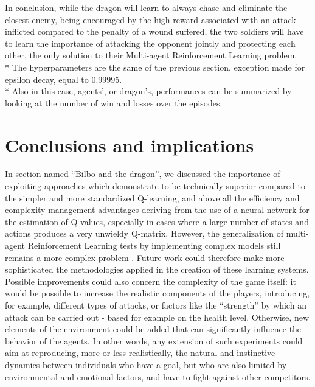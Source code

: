 In conclusion, while the dragon will learn to always chase and eliminate the closest enemy, being encouraged by the high reward associated with an attack inflicted compared to the penalty of a wound suffered, the two soldiers will have to learn the importance of attacking the opponent jointly and protecting each other, the only solution to their Multi-agent Reinforcement Learning problem.\\*
The hyperparameters are the same of the previous section, exception made for epsilon decay, equal to 0.99995.\\*
Also in this case, agents', or dragon's, performances can be summarized by looking at the number of win and losses over the episodes.

\section{Conclusions and implications}
In section named ``Bilbo and the dragon'', we discussed the importance of exploiting approaches which demonstrate to be technically superior compared to the simpler and more standardized Q-learning, and above all the efficiency and complexity management advantages deriving from the use of a neural network for the estimation of Q-values, especially in cases where a large number of states and actions produces a very unwieldy Q-matrix. However, the generalization of multi-agent Reinforcement Learning tests by implementing complex models still remains a more complex problem \cite{1}. Future work could therefore make more sophisticated the methodologies applied in the creation of these learning systems.
Possible improvements could also concern the complexity of the game itself: it would be possible to increase the realistic components of the players, introducing, for example, different types of attacks, or factors like the ``strength'' by which an attack can be carried out - based for example on the health level. Otherwise, new elements of the environment could be added that can significantly influence the behavior of the agents.
In other words, any extension of such experiments could aim at reproducing, more or less realistically, the natural and instinctive dynamics between individuals who have a goal, but who are also limited by environmental and emotional factors, and have to fight against other competitors.
\pagebreak



\onecolumn 

\appendix
